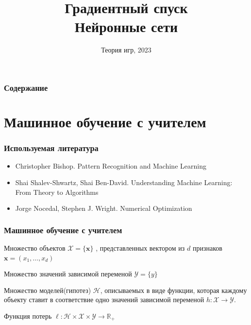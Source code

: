 \documentclass[notheorems]{beamer} %
\title[Теоретические основы  ML] %
{Градиентный спуск \\ Нейронные сети}
\date[Теория игр] %
{Теория игр,  2023}
\begin{document}
\frame{\titlepage}


\begin{frame}
\frametitle{Содержание}%
\tableofcontents
\end{frame}
\section{Машинное обучение с учителем}

\begin{frame}
	\frametitle{Используемая литература}
\begin{itemize}
	\item Christopher Bishop. Pattern Recognition and Machine Learning
	\item Shai Shalev-Shwartz, Shai Ben-David. Understanding Machine Learning: From Theory to Algorithms
	\item Jorge Nocedal, Stephen J. Wright. Numerical Optimization
\end{itemize}	






	
\end{frame}
\begin{frame}
	\frametitle{ Машинное обучение с учителем }
	
	
	Множество объектов  $\mathcal{X}=\{\textbf{x} \}$ , представленных вектором из  $d$ признаков $\textbf{x}=(x_1, \dots,x_d)$
	
	Множество значений зависимой переменой $\mathcal{Y}=\{y \}$  
	
	Множество моделей(гипотез) $\mathcal{H}$, описываемых в виде функции, которая каждому объекту ставит в соответствие одно  значений зависимой переменой $h: \mathcal{X} \to \mathcal{Y}$.
	
	Функция потерь $ \ell:\mathcal{H} \times \mathcal{X} \times \mathcal{Y} \to \mathbb{R_+}$
	
\end{frame}
\end{document}
